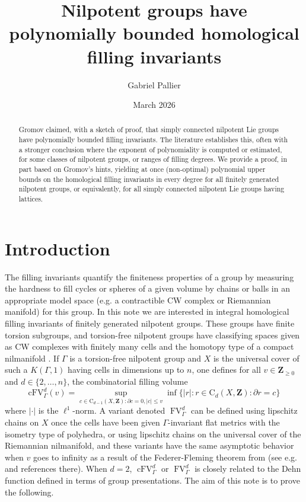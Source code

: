 \documentclass[12pt]{amsart}
\title[Nilpotent groups have polynomial filling]{Nilpotent groups have polynomially bounded homological filling invariants}
\author{Gabriel Pallier}
\date{March 2026}
\theoremstyle{definition}
\begin{document}

\maketitle

\begin{abstract}
    Gromov claimed, with a sketch of proof, that simply connected nilpotent Lie groups have polynomially bounded filling invariants. The literature establishes this, often with a stronger conclusion where the exponent of polynomiality is computed or estimated, for some classes of nilpotent groups, or ranges of filling degrees. We provide a proof, in part based on Gromov's hints, yielding at once (non-optimal) polynomial upper bounds on the homological filling invariants in every degree for all finitely generated nilpotent groups, or equivalently, for all simply connected nilpotent Lie groups having lattices. 
\end{abstract}

\section{Introduction}

The filling invariants quantify the finiteness properties of a group by measuring the hardness to fill cycles or spheres of a given volume by chains or balls in an appropriate model space (e.g. a contractible CW complex or Riemannian manifold) for this group.
In this note we are interested in integral homological filling invariants of finitely generated nilpotent groups. These groups have finite torsion subgroups, and torsion-free nilpotent groups have classifying spaces given as CW complexes with finitely many cells and the homotopy type of a compact nilmanifold \cite{MR28842}. If $\Gamma$ is a torsion-free nilpotent group and $X$ is the universal cover of such a $K(\Gamma,1)$ having cells in dimensions up to $n$, one defines for all $v \in \mathbf Z_{\geqslant 0}$ and $d \in \{2,\ldots, n \}$, the combinatorial filling volume
\[ \mathrm{cFV}_{\Gamma}^d(v) = \sup_{ c\in \mathrm{C}_{d-1}(X, \mathbf Z): \partial c = 0, \vert c \vert \leqslant v} \inf \{ \vert r \vert : r \in \mathrm{C}_d(X, \mathbf Z) : \partial r = c  \}
\]
where $\vert \cdot \vert$ is the $\ell^1$-norm. A variant denoted $\operatorname{FV}^d_\Gamma$ can be defined using lipschitz chains on $X$ once the cells have been given $\Gamma$-invariant flat metrics with the isometry type of polyhedra, or using lipschitz chains on the universal cover of the Riemannian nilmanifold, and these variants have the same asymptotic behavior when $v$ goes to infinity as a result of the Federer-Fleming theorem from \cite{MR123260} (see e.g. \cite[Theorem 6.6]{bader2026higherkazhdanpropertyunitary} and references there). When $d=2$, $\operatorname{cFV}_\Gamma^d$ or $\operatorname{FV}_\Gamma^d$ is closely related to the Dehn function defined in terms of group presentations.
The aim of this note is to prove the following.
\end{document}
